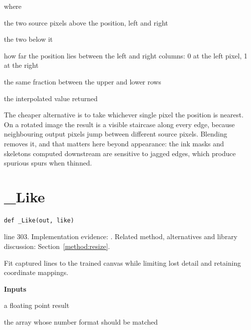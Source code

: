 \noindent where
\begin{description}[leftmargin=2.4em,style=nextline,font=\normalfont\ttfamily]\setlength\itemsep{1pt}
  \item[{$p_{00},\, p_{01}$}] \normalfont the two source pixels above the position, left and right
  \item[{$p_{10},\, p_{11}$}] \normalfont the two below it
  \item[{$f_x$}] \normalfont how far the position lies between the left and right columns: 0 at the left pixel, 1 at the right
  \item[{$f_y$}] \normalfont the same fraction between the upper and lower rows
  \item[{$v$}] \normalfont the interpolated value returned
\end{description}

The cheaper alternative is to take whichever single pixel the position is nearest. On a rotated image the result is a visible staircase along every edge, because neighbouring output pixels jump between different source pixels. Blending removes it, and that matters here beyond appearance: the ink masks and skeletons computed downstream are sensitive to jagged edges, which produce spurious spurs when thinned.



\section{\_Like}\label{fn:segment:-Like}
\begin{lstlisting}[style=sig]
def _Like(out, like)
\end{lstlisting}
 line 303. Implementation evidence: \cite{code2026}. Related method, alternatives and library discussion: Section~\ref{method:resize}.


Fit captured lines to the trained canvas while limiting lost detail and retaining coordinate mappings.




\noindent\textbf{Inputs}
\begin{description}[leftmargin=2.2em,style=nextline,font=\normalfont\ttfamily]\setlength\itemsep{1pt}
  \item[{out}] \normalfont a floating point result
  \item[{ref}] \normalfont the array whose number format should be matched
\end{description}

